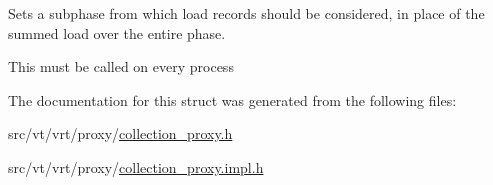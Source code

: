 Sets a subphase from which load records should be considered, in place of the summed load over the entire phase.

This must be called on every process 

The documentation for this struct was generated from the following files\+:\begin{DoxyCompactItemize}
\item 
src/vt/vrt/proxy/\hyperlink{collection__proxy_8h}{collection\+\_\+proxy.\+h}\item 
src/vt/vrt/proxy/\hyperlink{collection__proxy_8impl_8h}{collection\+\_\+proxy.\+impl.\+h}\end{DoxyCompactItemize}
